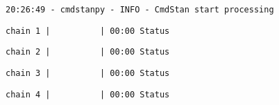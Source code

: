 \documentclass[11pt]{article}
\begin{document}
    \begin{Verbatim}[commandchars=\\\{\}]
20:26:49 - cmdstanpy - INFO - CmdStan start processing
    \end{Verbatim}

    
    \begin{Verbatim}[commandchars=\\\{\}]
chain 1 |          | 00:00 Status
    \end{Verbatim}

    
    
    \begin{Verbatim}[commandchars=\\\{\}]
chain 2 |          | 00:00 Status
    \end{Verbatim}

    
    
    \begin{Verbatim}[commandchars=\\\{\}]
chain 3 |          | 00:00 Status
    \end{Verbatim}

    
    
    \begin{Verbatim}[commandchars=\\\{\}]
chain 4 |          | 00:00 Status
    \end{Verbatim}

    
    \begin{Verbatim}[commandchars=\\\{\}]

    \end{Verbatim}
\end{document}
